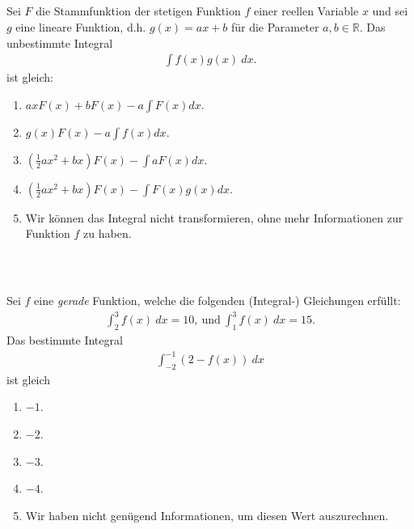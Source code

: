 \subsection*{}
Sei $ F $ die Stammfunktion der stetigen Funktion $ f $ einer reellen Variable $ x $ und sei $ g $ eine lineare Funktion, d.h. $ g(x) = ax +b $ für die Parameter $ a,b \in \mathbb{R} $. Das unbestimmte Integral
\begin{align*}
  \int f(x) g(x) \ dx.
\end{align*}
ist gleich:
\renewcommand{\labelenumi}{(\alph{enumi})}
\begin{enumerate}
\item 
$ a x F(x) + b F(x) - a \int F(x) dx$.
\item 
$ g(x) F(x) - a \int f(x) dx$.
\item 
$ \left(\frac{1}{2} a x^2 +b x\right) F(x) - \int a F(x) dx$.
\item
$ \left(\frac{1}{2} a x^2 +b x\right) F(x) - \int  F(x) g(x) dx$.
\item 
Wir können das Integral nicht transformieren, ohne mehr Informationen zur Funktion $ f $ zu haben.
\end{enumerate}
\ \\
\subsection*{}
Sei $ f $ eine \textit{gerade} Funktion, welche die folgenden (Integral-) Gleichungen erfüllt:
\begin{align*}
	\int_{2}^3 f(x) \ dx = 10, \ \textrm{und} \
	\int_1^3 f(x) \ dx = 15.
\end{align*}
Das bestimmte Integral
\begin{align*}
	\int_{-2}^{-1} (2 - f(x) ) \ dx
\end{align*}  
ist gleich
\renewcommand{\labelenumi}{(\alph{enumi})}
\begin{enumerate}
	\item 
	$ -1 $.
	\item
	$ -2 $.
	\item
	$ -3 $.
	\item
	$ -4 $.
	\item
	Wir haben nicht genügend Informationen, um diesen Wert auszurechnen.
\end{enumerate}
\ \\

